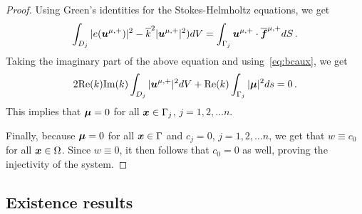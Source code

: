 \begin{proof}
Using Green's identities for the Stokes-Helmholtz equations, we get 
\begin{equation}
\int_{D_{j}} |e({\boldsymbol u}^{\mu,+})|^{2}  - \overline{k}^{2} |{\boldsymbol u}^{\mu,+}|^2) dV = 
\int_{\Gamma_{j}} {\boldsymbol u}^{\mu,+} \cdot \overline{{\boldsymbol f}}^{\mu,+} dS \, .
\end{equation}
Taking the imaginary part of the above equation and using~\cref{eq:bcaux}, 
we get
\begin{equation}
2 \text{Re}(k) \text{Im}(k) \int_{D_{j}} |{\boldsymbol u}^{\mu,+}|^2 dV 
+ \text{Re}(k) \int_{\Gamma_{j}} |{\boldsymbol \mu}|^2 ds = 0 \, .
\end{equation}
This implies that ${\boldsymbol \mu} =0$ for all ${\boldsymbol x} \in \Gamma_{j}$, $j=1,2,\ldots n$.

Finally, because ${\boldsymbol \mu} =0$ for all ${\boldsymbol x} \in \Gamma$ and 
$c_{j}= 0$, $j=1,2,\ldots n$, 
we get that $w \equiv c_{0}$ for all ${\boldsymbol x} \in \Omega$. 
Since $w\equiv 0$, it then follows that $c_{0} = 0$ as well, proving the 
injectivity of the system.

\end{proof}
\subsection{Existence results}

